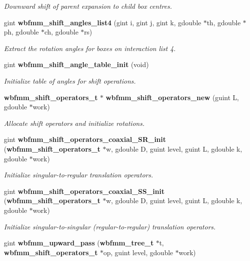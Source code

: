 \begin{DoxyCompactItemize}
\begin{DoxyCompactList}\small\item\em Downward shift of parent expansion to child box centres. \end{DoxyCompactList}\item 
gint {\bf wbfmm\+\_\+shift\+\_\+angles\+\_\+list4} (gint i, gint j, gint k, gdouble $\ast$th, gdouble $\ast$ph, gdouble $\ast$ch, gdouble $\ast$rs)
\begin{DoxyCompactList}\small\item\em Extract the rotation angles for boxes on interaction list 4. \end{DoxyCompactList}\item 
gint {\bf wbfmm\+\_\+shift\+\_\+angle\+\_\+table\+\_\+init} (void)
\begin{DoxyCompactList}\small\item\em Initialize table of angles for shift operations. \end{DoxyCompactList}\item 
{\bf wbfmm\+\_\+shift\+\_\+operators\+\_\+t} $\ast$ {\bf wbfmm\+\_\+shift\+\_\+operators\+\_\+new} (guint L, gdouble $\ast$work)
\begin{DoxyCompactList}\small\item\em Allocate shift operators and initialize rotations. \end{DoxyCompactList}\item 
gint {\bf wbfmm\+\_\+shift\+\_\+operators\+\_\+coaxial\+\_\+\+S\+R\+\_\+init} ({\bf wbfmm\+\_\+shift\+\_\+operators\+\_\+t} $\ast$w, gdouble D, guint level, guint L, gdouble k, gdouble $\ast$work)
\begin{DoxyCompactList}\small\item\em Initialize singular-\/to-\/regular translation operators. \end{DoxyCompactList}\item 
gint {\bf wbfmm\+\_\+shift\+\_\+operators\+\_\+coaxial\+\_\+\+S\+S\+\_\+init} ({\bf wbfmm\+\_\+shift\+\_\+operators\+\_\+t} $\ast$w, gdouble D, guint level, guint L, gdouble k, gdouble $\ast$work)
\begin{DoxyCompactList}\small\item\em Initialize singular-\/to-\/singular (regular-\/to-\/regular) translation operators. \end{DoxyCompactList}\item 
gint {\bf wbfmm\+\_\+upward\+\_\+pass} ({\bf wbfmm\+\_\+tree\+\_\+t} $\ast$t, {\bf wbfmm\+\_\+shift\+\_\+operators\+\_\+t} $\ast$op, guint level, gdouble $\ast$work)

\end{DoxyCompactItemize}

